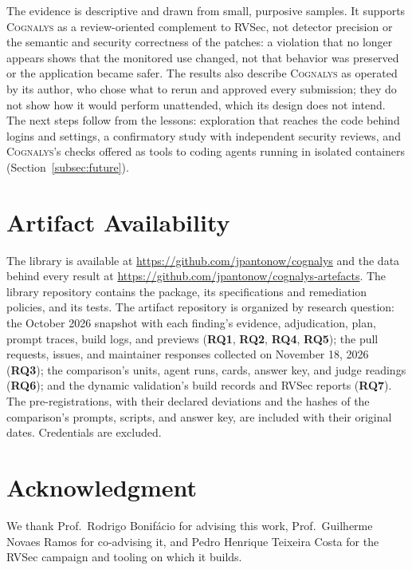\documentclass[conference]{IEEEtran}
\newcommand{\system}{\textsc{Cognalys}}
\newcommand{\researchq}[1]{\textbf{RQ#1}}
\begin{document}
The evidence is descriptive and drawn from small, purposive samples. It
supports \system{} as a review-oriented complement to RVSec, not detector
precision or the semantic and security correctness of the patches: a violation
that no longer appears shows that the monitored use changed, not that behavior
was preserved or the application became safer. The results also describe
\system{} as operated by its author, who chose what to rerun and approved every
submission; they do not show how it would perform unattended, which its design
does not intend. The next steps follow from the lessons: exploration that
reaches the code behind logins and settings, a confirmatory study with
independent security reviews, and \system{}'s checks offered as tools to coding
agents running in isolated containers (Section~\ref{subsec:future}).

\section*{Artifact Availability}

The library is available at \url{https://github.com/jpantonow/cognalys} and the
data behind every result at \url{https://github.com/jpantonow/cognalys-artefacts}. The library
repository contains the package, its specifications and remediation policies,
and its tests. The artifact repository is organized by research question: the
October 2026 snapshot with each finding's evidence, adjudication, plan, prompt
traces, build logs, and previews (\researchq{1}, \researchq{2}, \researchq{4},
\researchq{5}); the pull requests, issues, and maintainer responses collected on
November 18, 2026 (\researchq{3}); the comparison's units, agent runs, cards,
answer key, and judge readings (\researchq{6}); and the dynamic validation's
build records and RVSec reports (\researchq{7}). The pre-registrations, with
their declared deviations and the hashes of the comparison's prompts, scripts,
and answer key, are included with their original dates. Credentials are
excluded.

\section*{Acknowledgment}

We thank Prof.\ Rodrigo Bonifácio for advising this work, Prof.\ Guilherme
Novaes Ramos for co-advising it, and Pedro Henrique Teixeira Costa for the
RVSec campaign and tooling on which it builds.



\end{document}
